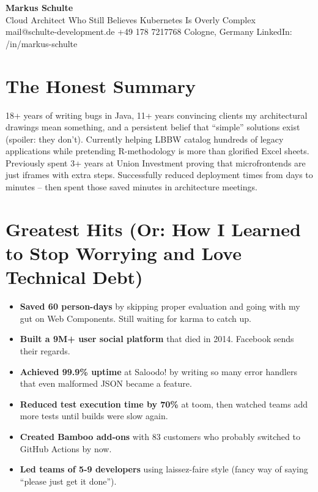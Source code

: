 \documentclass[10pt,a4paper]{article}
\begin{document}
{\LARGE\bfseries Markus Schulte} \\[3pt]
{\small Cloud Architect Who Still Believes Kubernetes Is Overly Complex} \\[2pt]
{\footnotesize mail@schulte-development.de \textbar{} +49 178 7217768 \textbar{} Cologne, Germany \textbar{} LinkedIn: /in/markus-schulte}

\section*{The Honest Summary}

18+ years of writing bugs in Java, 11+ years convincing clients my architectural drawings mean something, and a persistent belief that ``simple'' solutions exist (spoiler: they don't). Currently helping LBBW catalog hundreds of legacy applications while pretending R-methodology is more than glorified Excel sheets. Previously spent 3+ years at Union Investment proving that microfrontends are just iframes with extra steps. Successfully reduced deployment times from days to minutes -- then spent those saved minutes in architecture meetings.

\section*{Greatest Hits (Or: How I Learned to Stop Worrying and Love Technical Debt)}

\begin{itemize}[leftmargin=*, topsep=0pt, itemsep=1pt]
\item \textbf{Saved 60 person-days} by skipping proper evaluation and going with my gut on Web Components. Still waiting for karma to catch up.
\item \textbf{Built a 9M+ user social platform} that died in 2014. Facebook sends their regards.
\item \textbf{Achieved 99.9\% uptime} at Saloodo! by writing so many error handlers that even malformed JSON became a feature.
\item \textbf{Reduced test execution time by 70\%} at toom, then watched teams add more tests until builds were slow again.
\item \textbf{Created Bamboo add-ons} with 83 customers who probably switched to GitHub Actions by now.
\item \textbf{Led teams of 5-9 developers} using laissez-faire style (fancy way of saying ``please just get it done'').
\end{itemize}
\end{document}
